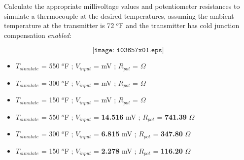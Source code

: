 

Calculate the appropriate millivoltage values and potentiometer resistances to simulate a thermocouple at the desired temperatures, assuming the ambient temperature at the transmitter is 72 $^{o}$F and the transmitter has cold junction compensation {\it enabled}:

$$\texttt{[image: i03657x01.eps]}$$

\begin{itemize}
\item{} $T_{simulate}$ = 550 $^{o}$F ; $V_{input}$ = \underbar{\hskip 50pt} mV ; $R_{pot}$ = \underbar{\hskip 50pt} $\Omega$
\vskip 10pt
\item{} $T_{simulate}$ = 300 $^{o}$F ; $V_{input}$ = \underbar{\hskip 50pt} mV ; $R_{pot}$ = \underbar{\hskip 50pt} $\Omega$
\vskip 10pt
\item{} $T_{simulate}$ = 150 $^{o}$F ; $V_{input}$ = \underbar{\hskip 50pt} mV ; $R_{pot}$ = \underbar{\hskip 50pt} $\Omega$
\end{itemize}







\begin{itemize}
\item{} $T_{simulate}$ = 550 $^{o}$F ; $V_{input}$ = {\bf 14.516} mV ; $R_{pot}$ = {\bf 741.39} $\Omega$
\vskip 10pt
\item{} $T_{simulate}$ = 300 $^{o}$F ; $V_{input}$ = {\bf 6.815} mV ; $R_{pot}$ = {\bf 347.80} $\Omega$
\vskip 10pt
\item{} $T_{simulate}$ = 150 $^{o}$F ; $V_{input}$ = {\bf 2.278} mV ; $R_{pot}$ = {\bf 116.20} $\Omega$
\end{itemize}









